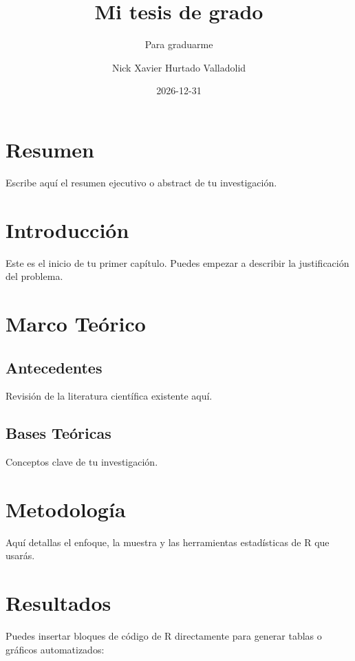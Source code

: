 \documentclass[
  spanish,
  11pt,
  letterpaper,
]{book}
\title{Mi tesis de grado}
\subtitle{Para graduarme}
\author{Nick Xavier Hurtado Valladolid}
\date{2026-12-31}
\begin{document}
\frontmatter
\maketitle


\mainmatter
\chapter*{Resumen}\label{resumen}

Escribe aquí el resumen ejecutivo o abstract de tu investigación.

\chapter{Introducción}\label{introducciuxf3n}

Este es el inicio de tu primer capítulo. Puedes empezar a describir la
justificación del problema.

\chapter{Marco Teórico}\label{marco-teuxf3rico}

\section{Antecedentes}\label{antecedentes}

Revisión de la literatura científica existente aquí.

\section{Bases Teóricas}\label{bases-teuxf3ricas}

Conceptos clave de tu investigación.

\chapter{Metodología}\label{metodologuxeda}

Aquí detallas el enfoque, la muestra y las herramientas estadísticas de
R que usarás.

\chapter{Resultados}\label{resultados}

Puedes insertar bloques de código de R directamente para generar tablas
o gráficos automatizados:
\end{document}

